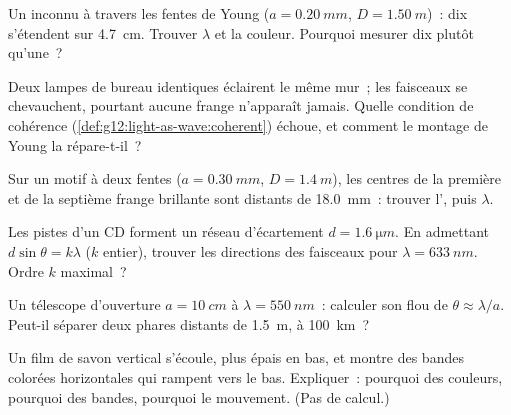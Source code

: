 \begin{exercise}[$\star\star$]\label{exo:g12:light-as-wave:7}
Un  inconnu à travers les fentes de Young
($a = \qty{0.20}{mm}$, $D = \qty{1.50}{m}$)~: dix
 s'étendent sur \qty{4.7}{cm}. Trouver
$\lambda$ et la couleur. Pourquoi mesurer dix plutôt qu'une~?
\end{exercise}

\begin{exercise}[$\star\star$]\label{exo:g12:light-as-wave:8}
Deux lampes de bureau identiques éclairent le même mur~; les faisceaux
se chevauchent, pourtant aucune frange n'apparaît jamais. Quelle
condition de cohérence
(\cref{def:g12:light-as-wave:coherent}) échoue, et comment le montage de
Young la répare-t-il~?
\end{exercise}

\begin{exercise}[$\star\star$]\label{exo:g12:light-as-wave:9}
Sur un motif à deux fentes ($a = \qty{0.30}{mm}$, $D = \qty{1.4}{m}$),
les centres de la première et de la septième frange brillante sont
distants de \qty{18.0}{mm}~: trouver l', puis
$\lambda$.
\end{exercise}

\begin{exercise}[$\star\star$]\label{exo:g12:light-as-wave:10}
Les pistes d'un CD forment un réseau d'écartement
$d = \qty{1.6}{\micro m}$. En admettant $d \sin\theta = k\lambda$
($k$ entier), trouver les directions des faisceaux pour
$\lambda = \qty{633}{nm}$. Ordre $k$ maximal~?
\end{exercise}

\begin{exercise}[$\star\star$]\label{exo:g12:light-as-wave:11}
Un télescope d'ouverture $a = \qty{10}{cm}$ à
$\lambda = \qty{550}{nm}$~: calculer son flou de
 $\theta \approx \lambda/a$. Peut-il séparer
deux phares distants de \qty{1.5}{m}, à \qty{100}{km}~?
\end{exercise}

\begin{exercise}[$\star\star\star$]\label{exo:g12:light-as-wave:12}
Un film de savon vertical s'écoule, plus épais en bas, et montre des
bandes colorées horizontales qui rampent vers le bas. Expliquer~:
pourquoi des couleurs, pourquoi des bandes, pourquoi le mouvement.
(Pas de calcul.)
\end{exercise}

